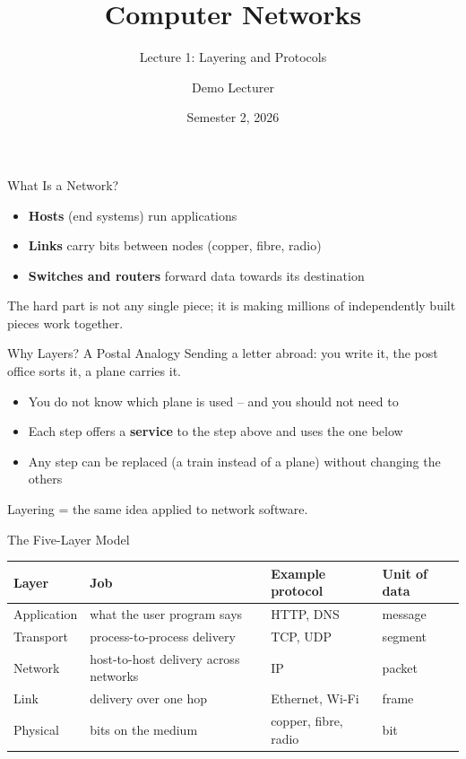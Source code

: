 \documentclass[aspectratio=169,11pt]{beamer}
\title{Computer Networks}
\subtitle{Lecture 1: Layering and Protocols}
\author{Demo Lecturer}
\date{Semester 2, 2026}
\begin{document}
\begin{frame}
  \titlepage
\end{frame}

\begin{frame}{What Is a Network?}
  \begin{itemize}
    \item \textbf{Hosts} (end systems) run applications
    \item \textbf{Links} carry bits between nodes (copper, fibre, radio)
    \item \textbf{Switches and routers} forward data towards its destination
  \end{itemize}
  \bigskip
  The hard part is not any single piece; it is making millions of independently
  built pieces work together.
\end{frame}

\begin{frame}{Why Layers? A Postal Analogy}
  Sending a letter abroad: you write it, the post office sorts it, a plane carries it.
  \medskip
  \begin{itemize}
    \item You do not know which plane is used -- and you should not need to
    \item Each step offers a \textbf{service} to the step above and uses the one below
    \item Any step can be replaced (a train instead of a plane) without changing the others
  \end{itemize}
  \medskip
  Layering = the same idea applied to network software.
\end{frame}

\begin{frame}{The Five-Layer Model}
  \begin{center}\small
  \begin{tabular}{llll}
    \hline
    Layer & Job & Example protocol & Unit of data \\
    \hline
    Application & what the user program says & HTTP, DNS & message \\
    Transport & process-to-process delivery & TCP, UDP & segment \\
    Network & host-to-host delivery across networks & IP & packet \\
    Link & delivery over one hop & Ethernet, Wi-Fi & frame \\
    Physical & bits on the medium & copper, fibre, radio & bit \\
    \hline
  \end{tabular}
  \end{center}
\end{frame}
\end{document}
